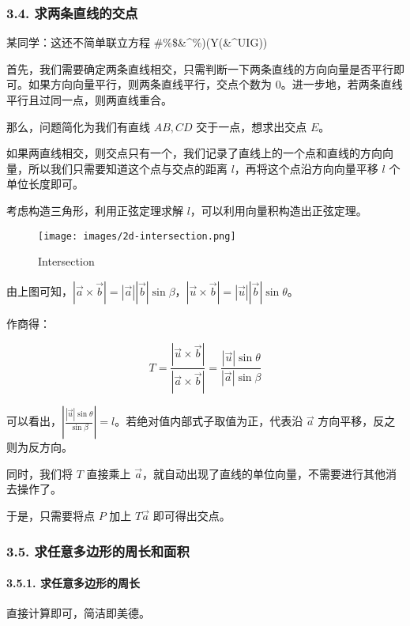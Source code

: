 \subsubsection{3.4. 求两条直线的交点}

\begin{QUOTE}{}{}
某同学：这还不简单联立方程 \#\%\$\&\textasciicircum{}\%)(Y(\&\textasciicircum{}UIG))
\end{QUOTE}

首先，我们需要确定两条直线相交，只需判断一下两条直线的方向向量是否平行即可。如果方向向量平行，则两条直线平行，交点个数为 $0$。进一步地，若两条直线平行且过同一点，则两直线重合。

那么，问题简化为我们有直线 $AB,CD$ 交于一点，想求出交点 $E$。

如果两直线相交，则交点只有一个，我们记录了直线上的一个点和直线的方向向量，所以我们只需要知道这个点与交点的距离 $l$，再将这个点沿方向向量平移 $l$ 个单位长度即可。

考虑构造三角形，利用正弦定理求解 $l$，可以利用向量积构造出正弦定理。

\begin{figure}[h]
\centering
\texttt{[image: images/2d-intersection.png]} 
\caption{Intersection}
\end{figure}

由上图可知，$|\vec a\times \vec b|=|\vec a||\vec b|\sin \beta$，$|\vec u\times \vec b|=|\vec u||\vec b|\sin \theta$。

作商得：

$$
T=\frac{|\vec u\times \vec b|}{|\vec a\times \vec b|}=\frac{|\vec u|\sin \theta}{|\vec a|\sin \beta}
$$

可以看出，$|\frac{|\vec u|\sin \theta}{\sin \beta}|=l​$。若绝对值内部式子取值为正，代表沿 $\vec a​$ 方向平移，反之则为反方向。

同时，我们将 $T$ 直接乘上 $\vec a$，就自动出现了直线的单位向量，不需要进行其他消去操作了。

于是，只需要将点 $P$ 加上 $T\vec a$ 即可得出交点。

\subsubsection{3.5. 求任意多边形的周长和面积}

\paragraph{3.5.1. 求任意多边形的周长}

直接计算即可，简洁即美德。

